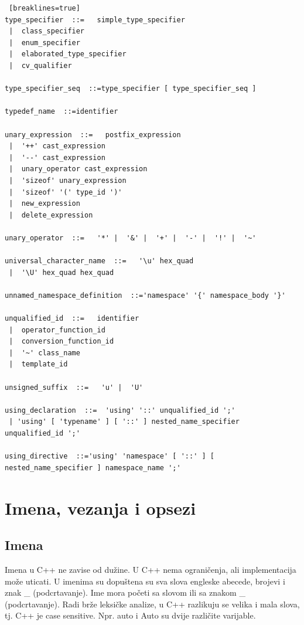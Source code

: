 \documentclass[11pt]{book}
\begin{document}
\begin{lstlisting} [breaklines=true]
type_specifier  ::=   simple_type_specifier
 |  class_specifier
 |  enum_specifier
 |  elaborated_type_specifier
 |  cv_qualifier

type_specifier_seq  ::=type_specifier [ type_specifier_seq ]

typedef_name  ::=identifier

unary_expression  ::=   postfix_expression
 |  '++' cast_expression
 |  '--' cast_expression
 |  unary_operator cast_expression
 |  'sizeof' unary_expression
 |  'sizeof' '(' type_id ')'
 |  new_expression
 |  delete_expression

unary_operator  ::=   '*' |  '&' |  '+' |  '-' |  '!' |  '~'

universal_character_name  ::=   '\u' hex_quad
 |  '\U' hex_quad hex_quad

unnamed_namespace_definition  ::='namespace' '{' namespace_body '}'

unqualified_id  ::=   identifier
 |  operator_function_id
 |  conversion_function_id
 |  '~' class_name
 |  template_id

unsigned_suffix  ::=   'u' |  'U'

using_declaration  ::=  'using' '::' unqualified_id ';'
 | 'using' [ 'typename' ] [ '::' ] nested_name_specifier unqualified_id ';'

using_directive  ::='using' 'namespace' [ '::' ] [ nested_name_specifier ] namespace_name ';'

\end{lstlisting}



\section{Imena, vezanja i opsezi}

\subsection{Imena}
Imena u C++ ne zavise od dužine. U C++ nema ograničenja, ali implementacija može uticati. U imenima su dopuštena su sva
slova engleske abecede, brojevi i znak \_  (podcrtavanje). Ime  mora početi sa slovom ili sa znakom \_ (podcrtavanje).
Radi brže leksičke analize, u C++ razlikuju se velika i mala slova, tj. C++ je case sensitive. Npr. auto i Auto su dvije različite varijable.
\end{document}
